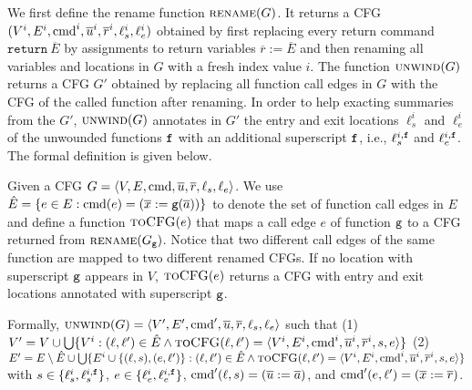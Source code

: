 We first define the rename function $\textsc{rename}(G)$. It returns a CFG $(V^i, E^i,\textmd{cmd}^i, \overline{u}^i, \overline{r}^i,\ell_s^i,\ell_e^i)$ obtained by first replacing every return command $\mathtt{return}\ \overline{E}$ by assignments to return variables $\overline{r} := \overline{E}$ and then renaming all variables and locations in $G$ with a fresh index value $i$. The function $\textsc{unwind}(G)$ returns a CFG $G'$ obtained by replacing all function call edges in $G$ with the CFG of the called function after renaming. In order to help exacting summaries from the $G'$, $\textsc{unwind}(G)$ annotates in $G'$ the entry and exit locations ${\ell_s^i}$ and ${\ell_e^i}$ of the unwounded functions $\mathtt{{f}}$ with an additional superscript $\mathtt{{f}}$, i.e., $\ell_s^{i,\mathtt{{f}}}$ and $\ell_e^{i,\mathtt{{f}}}$. The formal definition is given below.

Given a CFG $G=\langle
V, E,\textmd{cmd}, \overline{u}, \overline{r},{\ell_s},{\ell_e} \rangle$.
We use $\hat{E} =\{e\in E: \textmd{cmd} (e)= (\overline{x}:=\mathtt{g}(\overline{a}))\}$ to denote the set of function call edges in $E$ and define a function $\textsc{toCFG}(e)$ that maps a call edge $e$ of function $\mathtt{{g}}$ to a CFG returned from $\textsc{rename}(G_{\mathtt{{g}}})$. Notice that two different call edges of the same function are mapped to two different renamed CFGs. If no location with superscript $\mathtt{{g}}$ appears in $V$, $\textsc{toCFG}(e)$ returns a CFG with entry and exit locations annotated with superscript $\mathtt{{g}}$.

Formally, $\textsc{unwind}(G) = \langle V', E',\textmd{cmd}', \overline{u}, \overline{r},{\ell_s},{\ell_e} \rangle$ such that (1) $V' = V\cup \bigcup\{V^i:(\ell, \ell')\in \hat{E} \wedge \textsc{toCFG}(\ell, \ell')= \langle V^i, E^i,\textmd{cmd}^i, \overline{u}^i, \overline{r}^i,s,e\rangle \}$ (2) $E'= E \setminus \hat{E} \cup \bigcup\{E^i\cup\{(\ell, s),(e, \ell')\}: (\ell, \ell')\in \hat{E} \wedge \textsc{toCFG}(\ell, \ell')= \langle V^i, E^i,\textmd{cmd}^i, \overline{u}^i, \overline{r}^i,s,e\rangle \}$ with $s\in \{\ell_s^i,\ell_s^{i,\mathtt{{f}}}\}$, $e\in \{\ell_e^i,\ell_e^{i,\mathtt{{f}}}\}$, $\textmd{cmd}' (\ell, s) = (\overline{u}:=\overline{a})$, and $\textmd{cmd}' (e, \ell') = (\overline{x}:=\overline{r})$.





